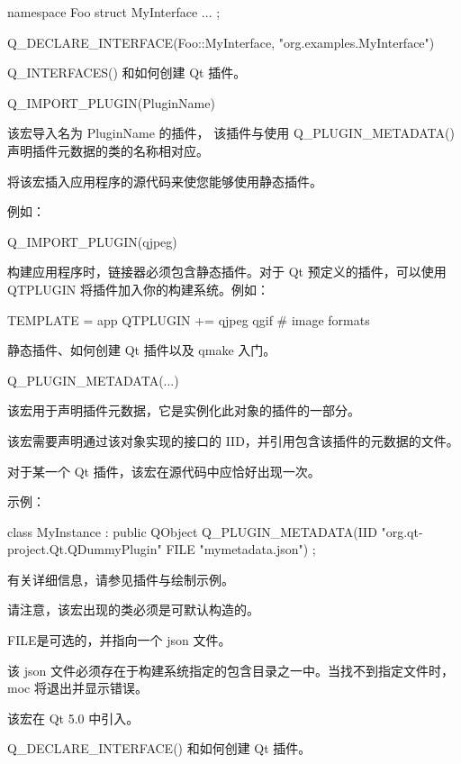 \begin{cppcode}
namespace Foo
{
    struct MyInterface { ... };
}

Q_DECLARE_INTERFACE(Foo::MyInterface, "org.examples.MyInterface")
\end{cppcode}

\begin{cppcode}
Q\_INTERFACES() 和如何创建 Qt 插件。
\end{cppcode}

Q\_IMPORT\_PLUGIN(PluginName)

该宏导入名为 PluginName 的插件，
该插件与使用 Q\_PLUGIN\_METADATA() 声明插件元数据的类的名称相对应。

将该宏插入应用程序的源代码来使您能够使用静态插件。

例如：

\begin{cppcode}
Q_IMPORT_PLUGIN(qjpeg)
\end{cppcode}

构建应用程序时，链接器必须包含静态插件。对于 Qt 预定义的插件，可以使用 QTPLUGIN 将插件加入你的构建系统。例如：

\begin{cppcode}
TEMPLATE      = app
QTPLUGIN     += qjpeg qgif    # image formats
\end{cppcode}


\begin{seeAlso}
 静态插件、如何创建 Qt 插件以及 qmake 入门。
\end{seeAlso}

Q\_PLUGIN\_METADATA(...)

该宏用于声明插件元数据，它是实例化此对象的插件的一部分。

该宏需要声明通过该对象实现的接口的 IID，并引用包含该插件的元数据的文件。

对于某一个 Qt 插件，该宏在源代码中应恰好出现一次。

示例：

\begin{cppcode}
class MyInstance : public QObject
{
    Q_PLUGIN_METADATA(IID "org.qt-project.Qt.QDummyPlugin" FILE "mymetadata.json")
};
\end{cppcode}

有关详细信息，请参见插件与绘制示例。

请注意，该宏出现的类必须是可默认构造的。

FILE是可选的，并指向一个 json 文件。

该 json 文件必须存在于构建系统指定的包含目录之一中。当找不到指定文件时，moc 将退出并显示错误。

该宏在 Qt 5.0 中引入。

\begin{seeAlso}
Q\_DECLARE\_INTERFACE() 和如何创建 Qt 插件。
\end{seeAlso}